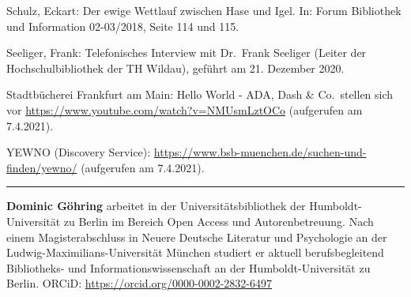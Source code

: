 \documentclass[a4paper,
fontsize=11pt,
oneside,
numbers=noperiodatend,
parskip=half-,
bibliography=totoc,
final
]{scrartcl}
\begin{document}
Schulz, Eckart: Der ewige Wettlauf zwischen Hase und Igel. In: Forum
Bibliothek und Information 02-03/2018, Seite 114 und 115.

Seeliger, Frank: Telefonisches Interview mit Dr.~Frank Seeliger (Leiter
der Hochschulbibliothek der TH Wildau), geführt am 21. Dezember 2020.

Stadtbücherei Frankfurt am Main: Hello World - ADA, Dash \& Co.~stellen
sich vor \url{https://www.youtube.com/watch?v=NMUsmLztOCo} (aufgerufen
am 7.4.2021).

YEWNO (Discovery Service):
\url{https://www.bsb-muenchen.de/suchen-und-finden/yewno/} (aufgerufen
am 7.4.2021).

\begin{center}\rule{0.5\linewidth}{0.5pt}\end{center}

\textbf{Dominic Göhring} arbeitet in der Universitätsbibliothek der Humboldt-Universität zu Berlin im Bereich Open Access und Autorenbetreuung. Nach einem Magisterabschluss in Neuere Deutsche Literatur und Psychologie an der Ludwig-Maximilians-Universität München studiert er aktuell berufsbegleitend Bibliotheks- und Informationswissenschaft an der Humboldt-Universität zu Berlin. ORCiD: \url{https://orcid.org/0000-0002-2832-6497}
\end{document}
